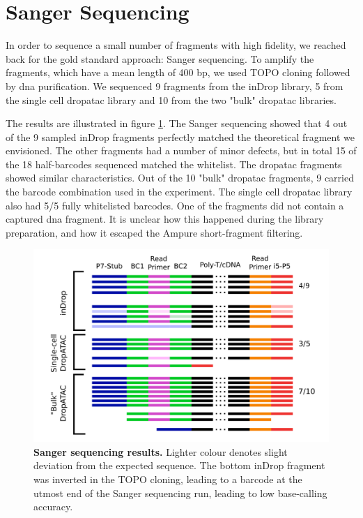 \section{Sanger Sequencing}
In order to sequence a small number of fragments with high fidelity, we reached back for the gold standard approach: Sanger sequencing. To amplify the fragments, which have a mean length of 400 bp, we used TOPO cloning followed by \acrshort{dna} purification. We sequenced 9 fragments from the inDrop library, 5 from the single cell \acrshort{dropatac} library and 10 from the two "bulk" \acrshort{dropatac} libraries.\pms

The results are illustrated in figure \ref{fig:seq_sanger}. The Sanger sequencing showed that 4 out of the 9 sampled inDrop fragments perfectly matched the theoretical fragment we envisioned. The other fragments had a number of minor defects, but in total 15 of the 18 half-barcodes sequenced matched the whitelist. The \acrshort{dropatac} fragments showed similar characteristics. Out of the 10 "bulk" \acrshort{dropatac} fragments, 9 carried the barcode combination used in the experiment. The single cell \acrshort{dropatac} library also had 5/5 fully whitelisted barcodes. One of the fragments did not contain a captured \acrshort{dna} fragment. It is unclear how this happened during the library preparation, and how it escaped the Ampure short-fragment filtering.\pms

\begin{figure}[ht]
\centerfloat
\includegraphics[width=\textwidth]{./ims/seq_sanger.png}
\caption[Sanger sequencing results]{\textbf{Sanger sequencing results.} Lighter colour denotes slight deviation from the expected sequence. The bottom inDrop fragment was inverted in the TOPO cloning, leading to a barcode at the utmost end of the Sanger sequencing run, leading to low base-calling accuracy.}
\label{fig:seq_sanger}
\end{figure}

